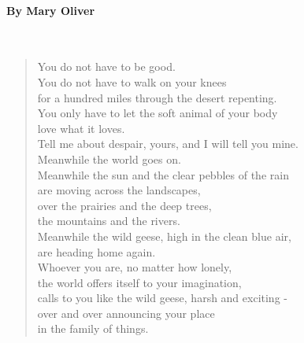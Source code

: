 \documentclass[10pt, letterpaper]{memoir}
\begin{document}
\paragraph{By Mary Oliver}~
\begin{verse}
	You do not have to be good.\\
	You do not have to walk on your knees\\
	for a hundred miles through the desert repenting.\\
	You only have to let the soft animal of your body\\
	love what it loves.\\
	Tell me about despair, yours, and I will tell you mine.\\
	Meanwhile the world goes on.\\
	Meanwhile the sun and the clear pebbles of the rain\\
	are moving across the landscapes,\\
	over the prairies and the deep trees,\\
	the mountains and the rivers.\\
	Meanwhile the wild geese, high in the clean blue air,\\
	are heading home again.\\
	Whoever you are, no matter how lonely,\\
	the world offers itself to your imagination,\\
	calls to you like the wild geese, harsh and exciting -\\
	over and over announcing your place\\
	in the family of things.
\end{verse}
\end{document}
